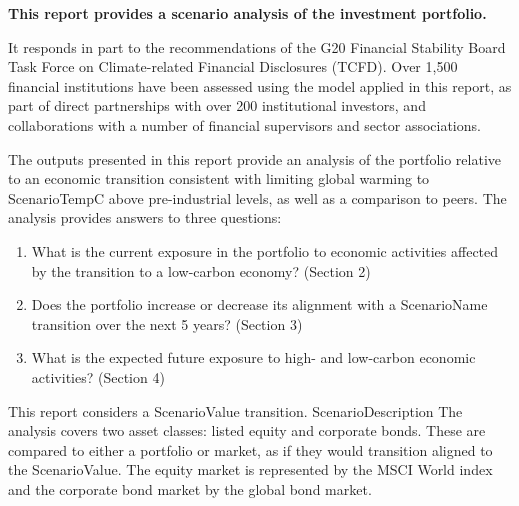 \documentclass[10pt,table]{article}\usepackage[]{graphicx}\usepackage[]{color}
\begin{document}
	\begin{multicols}{2}
		\textbf{This report provides a scenario analysis of the investment portfolio.} 

		It responds in part to the recommendations of the G20 Financial Stability Board Task Force on Climate-related Financial Disclosures (TCFD). Over 1,500 financial institutions have been assessed using the model applied in this report, as part of direct partnerships with over 200 institutional investors, and collaborations with a number of financial supervisors and sector associations. 

		The outputs presented in this report provide an analysis of the portfolio relative to an economic transition consistent with limiting global warming to ScenarioTemp\degree C above pre-industrial levels, as well as a comparison to peers. The analysis provides answers to three questions: 

		\begin{enumerate}
			\item{What is the current exposure in the portfolio to economic activities affected by the transition to a low-carbon economy? (Section 2)}
			\item{Does the portfolio increase or decrease its alignment with a ScenarioName transition over the next 5 years? (Section 3)}
			\item{What is the expected future exposure to high- and low-carbon economic activities? (Section 4)}
		\end{enumerate}

		This report considers a ScenarioValue transition. ScenarioDescription The analysis covers two asset classes: listed equity and corporate bonds. These are compared to either a portfolio or market, as if they would transition aligned to the ScenarioValue. The equity market is represented by the MSCI World index and the corporate bond market by the global bond market. \columnbreak




\end{multicols}
\end{document}
